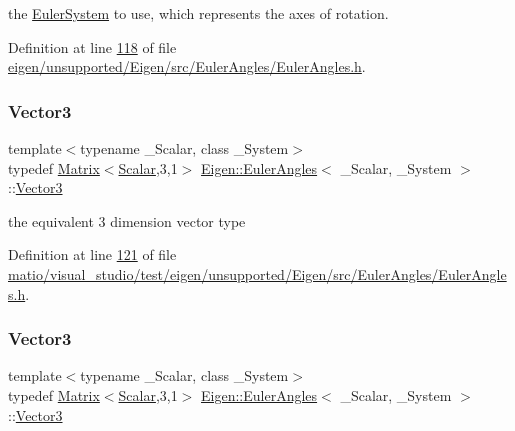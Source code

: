 the \hyperlink{class_eigen_1_1_euler_system}{Euler\+System} to use, which represents the axes of rotation. 

Definition at line \hyperlink{eigen_2unsupported_2_eigen_2src_2_euler_angles_2_euler_angles_8h_source_l00118}{118} of file \hyperlink{eigen_2unsupported_2_eigen_2src_2_euler_angles_2_euler_angles_8h_source}{eigen/unsupported/\+Eigen/src/\+Euler\+Angles/\+Euler\+Angles.\+h}.

\mbox{\label{class_eigen_1_1_euler_angles_af0f446aa0f46b3439abedff63fabf39c}} 
\subsubsection{\texorpdfstring{Vector3}{Vector3}\hspace{0.1cm}{\footnotesize\ttfamily [1/2]}}
{\footnotesize\ttfamily template$<$typename \+\_\+\+Scalar, class \+\_\+\+System$>$ \\
typedef \hyperlink{group___core___module_class_eigen_1_1_matrix}{Matrix}$<$\hyperlink{class_eigen_1_1_euler_angles_a2ab1d433ac9683268446f8905ac31aac}{Scalar},3,1$>$ \hyperlink{class_eigen_1_1_euler_angles}{Eigen\+::\+Euler\+Angles}$<$ \+\_\+\+Scalar, \+\_\+\+System $>$\+::\hyperlink{class_eigen_1_1_euler_angles_af0f446aa0f46b3439abedff63fabf39c}{Vector3}}

the equivalent 3 dimension vector type 

Definition at line \hyperlink{matio_2visual__studio_2test_2eigen_2unsupported_2_eigen_2src_2_euler_angles_2_euler_angles_8h_source_l00121}{121} of file \hyperlink{matio_2visual__studio_2test_2eigen_2unsupported_2_eigen_2src_2_euler_angles_2_euler_angles_8h_source}{matio/visual\+\_\+studio/test/eigen/unsupported/\+Eigen/src/\+Euler\+Angles/\+Euler\+Angles.\+h}.

\mbox{\label{class_eigen_1_1_euler_angles_af0f446aa0f46b3439abedff63fabf39c}} 
\subsubsection{\texorpdfstring{Vector3}{Vector3}\hspace{0.1cm}{\footnotesize\ttfamily [2/2]}}
{\footnotesize\ttfamily template$<$typename \+\_\+\+Scalar, class \+\_\+\+System$>$ \\
typedef \hyperlink{group___core___module_class_eigen_1_1_matrix}{Matrix}$<$\hyperlink{class_eigen_1_1_euler_angles_a2ab1d433ac9683268446f8905ac31aac}{Scalar},3,1$>$ \hyperlink{class_eigen_1_1_euler_angles}{Eigen\+::\+Euler\+Angles}$<$ \+\_\+\+Scalar, \+\_\+\+System $>$\+::\hyperlink{class_eigen_1_1_euler_angles_af0f446aa0f46b3439abedff63fabf39c}{Vector3}}


